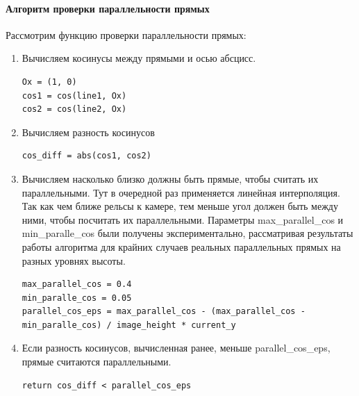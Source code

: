 \begin{enumerate}
\begin{figure}[!h]
\begin{minipage}{0.45\textwidth}
			\caption[X]{}
			\label{fig:xcross_revert}
		\end{minipage}
	\end{figure}
\end{enumerate}
\newpage

\paragraph{Алгоритм проверки параллельности прямых}
Рассмотрим функцию проверки параллельности прямых:
\begin{enumerate}
	\item Вычисляем косинусы между прямыми и осью абсцисс.
	\begin{lstlisting}
Ox = (1, 0)
cos1 = cos(line1, Ox)
cos2 = cos(line2, Ox)
	\end{lstlisting}
	\item Вычисляем разность косинусов
	\begin{lstlisting}
cos_diff = abs(cos1, cos2)
	\end{lstlisting}
	\item Вычисляем насколько близко должны быть прямые, чтобы считать их параллельными. Тут в очередной раз применяется линейная интерполяция. Так как чем ближе рельсы к камере, тем меньше угол должен быть между ними, чтобы посчитать их параллельными. Параметры max\_parallel\_cos и min\_paralle\_cos были получены экспериментально, рассматривая результаты работы алгоритма для крайних случаев 
	реальных параллельных прямых на разных уровнях высоты.
	\begin{lstlisting}
max_parallel_cos = 0.4
min_paralle_cos = 0.05
parallel_cos_eps = max_parallel_cos - (max_parallel_cos - 
min_paralle_cos) / image_height * current_y
	\end{lstlisting}
	\item Если разность косинусов, вычисленная ранее, меньше parallel\_cos\_eps, прямые считаются параллельными.
	\begin{lstlisting}
return cos_diff < parallel_cos_eps
	\end{lstlisting}
\end{enumerate}              
